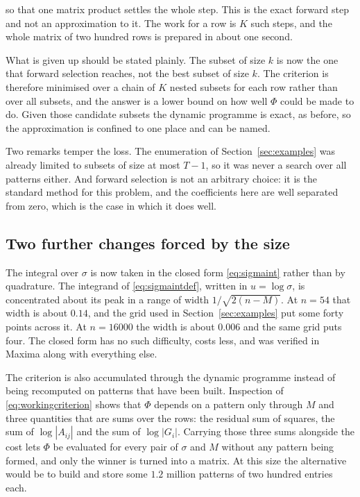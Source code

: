 so that one matrix product settles the whole step. This is the exact forward step
and not an approximation to it. The work for a row is $K$ such steps, and the whole
matrix of two hundred rows is prepared in about one second.

What is given up should be stated plainly. The subset of size $k$ is now the one
that forward selection reaches, not the best subset of size $k$. The criterion is
therefore minimised over a chain of $K$ nested subsets for each row rather than over
all subsets, and the answer is a lower bound on how well $\Phi$ could be made to do.
Given those candidate subsets the dynamic programme is exact, as before, so the
approximation is confined to one place and can be named.

Two remarks temper the loss. The enumeration of Section~\ref{sec:examples} was
already limited to subsets of size at most $T-1$, so it was never a search over all
patterns either. And forward selection is not an arbitrary choice: it is the
standard method for this problem, and the coefficients here are well separated from
zero, which is the case in which it does well.

\subsection{Two further changes forced by the size}

The integral over $\sigma$ is now taken in the closed form \eqref{eq:sigmaint}
rather than by quadrature. The integrand of \eqref{eq:sigmaintdef}, written in
$u = \log \sigma$, is concentrated about its peak in a range of width
$1 / \sqrt{2(n-M)}$. At $n = 54$ that width is about $0.14$, and the grid used in
Section~\ref{sec:examples} put some forty points across it. At $n = 16000$ the width
is about $0.006$ and the same grid puts four. The closed form has no such
difficulty, costs less, and was verified in Maxima along with everything else.

The criterion is also accumulated through the dynamic programme instead of being
recomputed on patterns that have been built. Inspection of
\eqref{eq:workingcriterion} shows that $\Phi$ depends on a pattern only through $M$
and three quantities that are sums over the rows: the residual sum of squares, the
sum of $\log |A_{ij}|$ and the sum of $\log |G_{i}|$. Carrying those three sums
alongside the cost lets $\Phi$ be evaluated for every pair of $\sigma$ and $M$
without any pattern being formed, and only the winner is turned into a matrix. At
this size the alternative would be to build and store some $1.2$ million patterns of
two hundred entries each.


